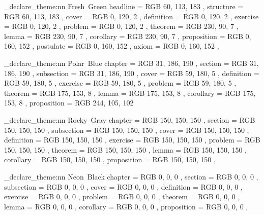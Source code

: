 \elegant_declare_theme:nn { Fresh~Green }
  {
    headline     =   {RGB}{ 60,  113, 183 },
    structure    =   {RGB}{ 60,  113, 183 },
    cover        =   {RGB}{ 0,   120, 2   },
    definition   =   {RGB}{ 0,   120, 2   },
    exercise     =   {RGB}{ 0,   120, 2   },
    problem      =   {RGB}{ 0,   120, 2   },
    theorem      =   {RGB}{ 230, 90,  7   },
    lemma        =   {RGB}{ 230, 90,  7   },
    corollary    =   {RGB}{ 230, 90,  7   },
    proposition  =   {RGB}{ 0,   160, 152 },
    postulate    =   {RGB}{ 0,   160, 152 },
    axiom        =   {RGB}{ 0,   160, 152 },
  }

\elegant_declare_theme:nn { Polar~Blue }
  {
    chapter      =   {RGB}{ 31,  186, 190 },
    section      =   {RGB}{ 31,  186, 190 },
    subsection   =   {RGB}{ 31,  186, 190 },
    cover        =   {RGB}{ 59,  180, 5   },
    definition   =   {RGB}{ 59,  180, 5   },
    exercise     =   {RGB}{ 59,  180, 5   },
    problem      =   {RGB}{ 59,  180, 5   },
    theorem      =   {RGB}{ 175, 153, 8   },
    lemma        =   {RGB}{ 175, 153, 8   },
    corollary    =   {RGB}{ 175, 153, 8   },
    proposition  =   {RGB}{ 244, 105, 102 }
  }


\elegant_declare_theme:nn { Rocky~Gray }
  {
    chapter      =   {RGB}{ 150, 150, 150 },
    section      =   {RGB}{ 150, 150, 150 },
    subsection   =   {RGB}{ 150, 150, 150 },
    cover        =   {RGB}{ 150, 150, 150 },
    definition   =   {RGB}{ 150, 150, 150 },
    exercise     =   {RGB}{ 150, 150, 150 },
    problem      =   {RGB}{ 150, 150, 150 },
    theorem      =   {RGB}{ 150, 150, 150 },
    lemma        =   {RGB}{ 150, 150, 150 },
    corollary    =   {RGB}{ 150, 150, 150 },
    proposition  =   {RGB}{ 150, 150, 150 },
  }

\elegant_declare_theme:nn { Neon~Black }
  {
    chapter      =   {RGB}{ 0,   0,   0   },
    section      =   {RGB}{ 0,   0,   0   },
    subsection   =   {RGB}{ 0,   0,   0   },
    cover        =   {RGB}{ 0,   0,   0   },
    definition   =   {RGB}{ 0,   0,   0   },
    exercise     =   {RGB}{ 0,   0,   0   },
    problem      =   {RGB}{ 0,   0,   0   },
    theorem      =   {RGB}{ 0,   0,   0   },
    lemma        =   {RGB}{ 0,   0,   0   },
    corollary    =   {RGB}{ 0,   0,   0   },
    proposition  =   {RGB}{ 0,   0,   0   },
  }

\endinput